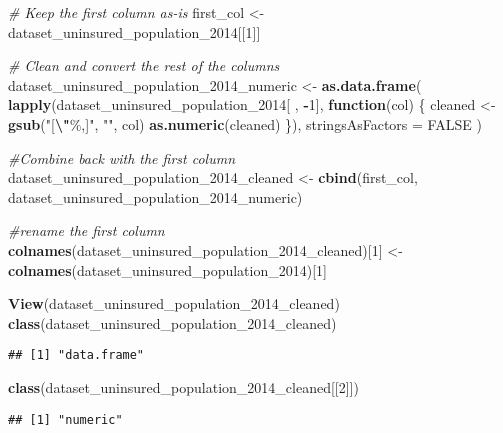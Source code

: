 \documentclass[
]{article}
\newenvironment{Shaded}{\begin{snugshade}}{\end{snugshade}}
\newcommand{\AttributeTok}[1]{\textcolor[rgb]{0.13,0.29,0.53}{#1}}
\newcommand{\CommentTok}[1]{\textcolor[rgb]{0.56,0.35,0.01}{\textit{#1}}}
\newcommand{\ConstantTok}[1]{\textcolor[rgb]{0.56,0.35,0.01}{#1}}
\newcommand{\ControlFlowTok}[1]{\textcolor[rgb]{0.13,0.29,0.53}{\textbf{#1}}}
\newcommand{\DecValTok}[1]{\textcolor[rgb]{0.00,0.00,0.81}{#1}}
\newcommand{\FunctionTok}[1]{\textcolor[rgb]{0.13,0.29,0.53}{\textbf{#1}}}
\newcommand{\NormalTok}[1]{#1}
\newcommand{\OtherTok}[1]{\textcolor[rgb]{0.56,0.35,0.01}{#1}}
\newcommand{\SpecialCharTok}[1]{\textcolor[rgb]{0.81,0.36,0.00}{\textbf{#1}}}
\newcommand{\StringTok}[1]{\textcolor[rgb]{0.31,0.60,0.02}{#1}}
\begin{document}
\begin{Shaded}
\begin{Highlighting}[]
\CommentTok{\# Keep the first column as{-}is}
\NormalTok{first\_col }\OtherTok{\textless{}{-}}\NormalTok{ dataset\_uninsured\_population\_2014[[}\DecValTok{1}\NormalTok{]]}

\CommentTok{\# Clean and convert the rest of the columns}
\NormalTok{dataset\_uninsured\_population\_2014\_numeric }\OtherTok{\textless{}{-}} \FunctionTok{as.data.frame}\NormalTok{(}
  \FunctionTok{lapply}\NormalTok{(dataset\_uninsured\_population\_2014[ , }\SpecialCharTok{{-}}\DecValTok{1}\NormalTok{], }\ControlFlowTok{function}\NormalTok{(col) \{}
\NormalTok{    cleaned }\OtherTok{\textless{}{-}} \FunctionTok{gsub}\NormalTok{(}\StringTok{"[}\SpecialCharTok{\textbackslash{}"}\StringTok{\%,]"}\NormalTok{, }\StringTok{""}\NormalTok{, col)}
    \FunctionTok{as.numeric}\NormalTok{(cleaned)}
\NormalTok{  \}),}
  \AttributeTok{stringsAsFactors =} \ConstantTok{FALSE}
\NormalTok{)}

\CommentTok{\#Combine back with the first column}
\NormalTok{dataset\_uninsured\_population\_2014\_cleaned }\OtherTok{\textless{}{-}} \FunctionTok{cbind}\NormalTok{(first\_col, dataset\_uninsured\_population\_2014\_numeric)}

\CommentTok{\#rename the first column}
\FunctionTok{colnames}\NormalTok{(dataset\_uninsured\_population\_2014\_cleaned)[}\DecValTok{1}\NormalTok{] }\OtherTok{\textless{}{-}} \FunctionTok{colnames}\NormalTok{(dataset\_uninsured\_population\_2014)[}\DecValTok{1}\NormalTok{]}

\FunctionTok{View}\NormalTok{(dataset\_uninsured\_population\_2014\_cleaned)}
\FunctionTok{class}\NormalTok{(dataset\_uninsured\_population\_2014\_cleaned)}
\end{Highlighting}
\end{Shaded}

\begin{verbatim}
## [1] "data.frame"
\end{verbatim}

\begin{Shaded}
\begin{Highlighting}[]
\FunctionTok{class}\NormalTok{(dataset\_uninsured\_population\_2014\_cleaned[[}\DecValTok{2}\NormalTok{]])}
\end{Highlighting}
\end{Shaded}

\begin{verbatim}
## [1] "numeric"
\end{verbatim}
\end{document}
